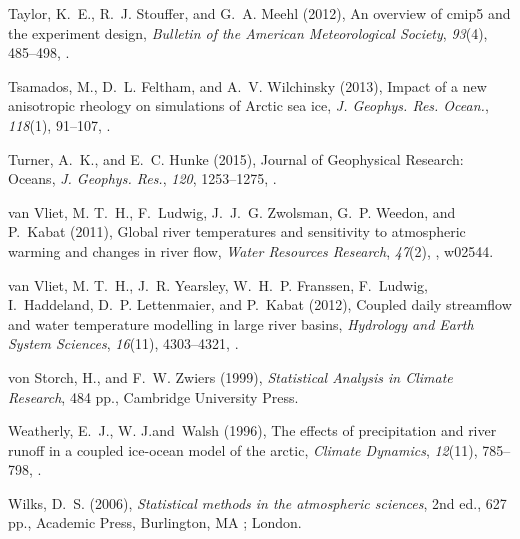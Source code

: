 \documentclass[jgrga, draft]{agutex}
\begin{document}
\begin{article}
\begin{thebibliography}{79}
Taylor, K.~E., R.~J. Stouffer, and G.~A. Meehl (2012), An overview of cmip5 and
  the experiment design, \textit{Bulletin of the American Meteorological
  Society}, \textit{93}(4), 485--498, .

Tsamados, M., D.~L. Feltham, and A.~V. Wilchinsky (2013), {Impact of a new
  anisotropic rheology on simulations of Arctic sea ice}, \textit{J. Geophys.
  Res. Ocean.}, \textit{118}(1), 91--107, .

Turner, A.~K., and E.~C. Hunke (2015), {Journal of Geophysical Research:
  Oceans}, \textit{J. Geophys. Res.}, \textit{120}, 1253--1275,
  .

van Vliet, M. T.~H., F.~Ludwig, J.~J.~G. Zwolsman, G.~P. Weedon, and P.~Kabat
  (2011), Global river temperatures and sensitivity to atmospheric warming and
  changes in river flow, \textit{Water Resources Research}, \textit{47}(2),
  , w02544.

van Vliet, M. T.~H., J.~R. Yearsley, W.~H.~P. Franssen, F.~Ludwig,
  I.~Haddeland, D.~P. Lettenmaier, and P.~Kabat (2012), Coupled daily
  streamflow and water temperature modelling in large river basins,
  \textit{Hydrology and Earth System Sciences}, \textit{16}(11), 4303--4321,
  .

von Storch, H., and F.~W. Zwiers (1999), \textit{{Statistical Analysis in
  Climate Research}}, 484 pp., Cambridge University Press.

Weatherly, E.~J., W. J.and~Walsh (1996), The effects of precipitation and river
  runoff in a coupled ice-ocean model of the arctic, \textit{Climate Dynamics},
  \textit{12}(11), 785--798, .

Wilks, D.~S. (2006), \textit{{Statistical methods in the atmospheric
  sciences}}, 2nd ed., 627 pp., Academic Press, Burlington, MA ; London.


\end{thebibliography}
\end{article}
\end{document}
